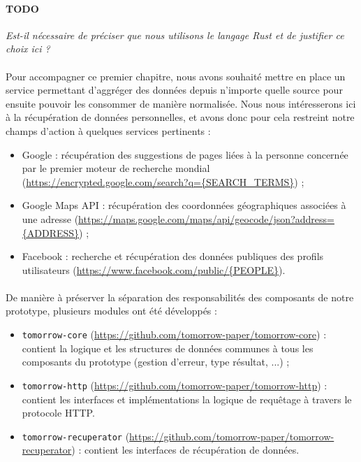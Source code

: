 \paragraph{TODO} \emph{Est-il nécessaire de préciser que nous utilisons le langage Rust et de justifier ce choix ici ?}

\paragraph{} Pour accompagner ce premier chapitre, nous avons souhaité mettre en place un service permettant d'aggréger
des données depuis n'importe quelle source pour ensuite pouvoir les consommer de manière normalisée.
Nous nous intéresserons ici à la récupération de données personnelles, et avons donc pour cela restreint notre champs
d'action à quelques services pertinents :

\begin{itemize}
    \item Google : récupération des suggestions de pages liées à la personne concernée par le
    premier moteur de recherche mondial (\url{https://encrypted.google.com/search?q={SEARCH_TERMS}}) ;
    \item Google Maps API : récupération des coordonnées géographiques associées à une adresse
    (\url{https://maps.google.com/maps/api/geocode/json?address={ADDRESS}}) ;
    \item Facebook : recherche et récupération des données publiques des profils utilisateurs
    (\url{https://www.facebook.com/public/{PEOPLE}}).
\end{itemize}

\paragraph{} De manière à préserver la séparation des responsabilités des composants de notre prototype, plusieurs modules
ont été développés : 

\begin{itemize}
    \item \lstinline{tomorrow-core} (\url{https://github.com/tomorrow-paper/tomorrow-core}) : contient la logique et les
    structures de données communes à tous les composants du prototype (gestion d'erreur, type résultat, ...) ;
    \item \lstinline{tomorrow-http} (\url{https://github.com/tomorrow-paper/tomorrow-http}) : contient les interfaces et
    implémentations la logique de requêtage à travers le protocole HTTP.
    \item \lstinline{tomorrow-recuperator} (\url{https://github.com/tomorrow-paper/tomorrow-recuperator}) : contient les interfaces
    de récupération de données.
\end{itemize}

